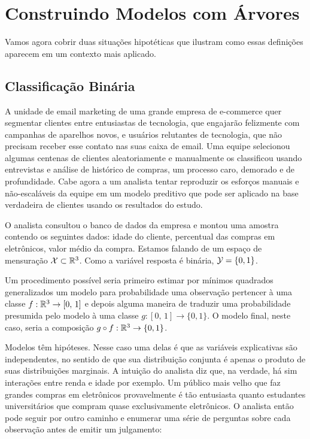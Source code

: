 \section{Construindo Modelos com Árvores}

Vamos agora cobrir duas situações hipotéticas que ilustram como essas definições aparecem em um contexto mais aplicado.

\subsection{Classificação Binária}

 A unidade de email marketing de uma grande empresa de e-commerce quer segmentar clientes entre entusiastas de tecnologia, que engajarão felizmente com campanhas de aparelhos novos, e usuários relutantes de tecnologia, que não precisam receber esse contato nas suas caixa de email. Uma equipe selecionou algumas centenas de clientes aleatoriamente e manualmente os classificou usando entrevistas e análise de histórico de compras, um processo caro, demorado e de profundidade. Cabe agora a um analista tentar reproduzir os esforços manuais e não-escaláveis da equipe em um modelo preditivo que pode ser aplicado na base verdadeira de clientes usando os resultados do estudo.

O analista consultou o banco de dados da empresa e montou uma amostra contendo os seguintes dados: idade do cliente, percentual das compras em eletrônicos, valor médio da compra. Estamos falando de um espaço de mensuração $\mathcal{X} \subset \mathbb{R}^3$. Como a variável resposta é binária, $\mathcal{Y} = \{0, 1\}$. 

Um procedimento possível seria primeiro estimar por mínimos quadrados generalizados um modelo para probabilidade uma observação pertencer à uma classe $f: \mathbb{R}^3 \to [0, \, 1]$ e depois alguma maneira de traduzir uma probabilidade presumida pelo modelo à uma classe $g: [0, \, 1] \to \{0, 1\}$. O modelo final, neste caso, seria a composição $g \circ f: \mathbb{R}^3 \to \{0, 1\} $.

Modelos têm hipóteses. Nesse caso uma delas é que as variáveis explicativas são independentes, no sentido de que sua distribuição conjunta é apenas o produto de suas distribuições marginais. A intuição do analista diz que, na verdade, há sim interações entre renda e idade por exemplo. Um público mais velho que faz grandes compras em eletrônicos provavelmente é tão entusiasta quanto estudantes universitários que compram quase exclusivamente eletrônicos. O analista então pode seguir por outro caminho e enumerar uma série de perguntas sobre cada observação antes de emitir um julgamento:

